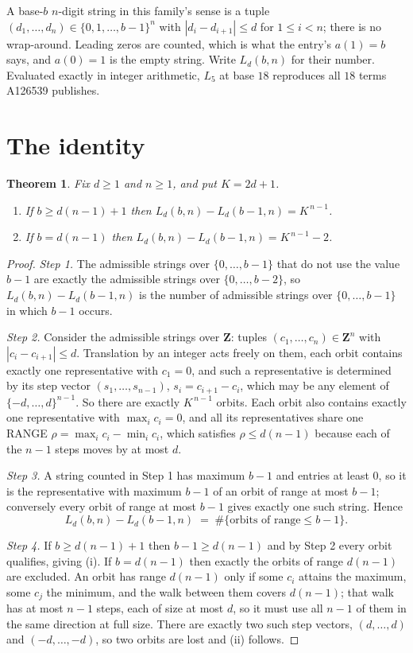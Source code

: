 \documentclass[11pt,a4paper]{article}
\theoremstyle{plain}
\newtheorem{theorem}{Theorem}
\theoremstyle{definition}
\begin{document}
A base-$b$ $n$-digit string in this family's sense is a tuple
$(d_1,\dots,d_n)\in\{0,1,\dots,b-1\}^{n}$ with $|d_i-d_{i+1}|\le d$ for $1\le i<n$; there
is no wrap-around. Leading zeros are counted, which is what the entry's $a(1)=b$ says, and
$a(0)=1$ is the empty string. Write $L_d(b,n)$ for their number. Evaluated exactly in integer
arithmetic, $L_{5}$ at base $18$ reproduces all $18$ terms A126539 publishes.

\section{The identity}

\begin{theorem}
Fix $d\ge1$ and $n\ge1$, and put $K=2d+1$.
\begin{enumerate}
\item[(i)] If $b\ge d(n-1)+1$ then $L_d(b,n)-L_d(b-1,n)=K^{\,n-1}$.
\item[(ii)] If $b=d(n-1)$ then $L_d(b,n)-L_d(b-1,n)=K^{\,n-1}-2$.
\end{enumerate}
\end{theorem}

\begin{proof}
\emph{Step 1.} The admissible strings over $\{0,\dots,b-1\}$ that do not use the value $b-1$
are exactly the admissible strings over $\{0,\dots,b-2\}$, so $L_d(b,n)-L_d(b-1,n)$ is the
number of admissible strings over $\{0,\dots,b-1\}$ in which $b-1$ occurs.

\emph{Step 2.} Consider the admissible strings over $\mathbf{Z}$: tuples
$(c_1,\dots,c_n)\in\mathbf{Z}^{n}$ with $|c_i-c_{i+1}|\le d$. Translation by an integer acts
freely on them, each orbit contains exactly one representative with $c_1=0$, and such a
representative is determined by its step vector $(s_1,\dots,s_{n-1})$, $s_i=c_{i+1}-c_i$,
which may be any element of $\{-d,\dots,d\}^{n-1}$. So there are exactly $K^{\,n-1}$ orbits.
Each orbit also contains exactly one representative with $\max_i c_i=0$, and all its
representatives share one RANGE $\rho=\max_ic_i-\min_ic_i$, which satisfies
$\rho\le d(n-1)$ because each of the $n-1$ steps moves by at most $d$.

\emph{Step 3.} A string counted in Step 1 has maximum $b-1$ and entries at least $0$, so it is
the representative with maximum $b-1$ of an orbit of range at most $b-1$; conversely every orbit
of range at most $b-1$ gives exactly one such string. Hence
\[
L_d(b,n)-L_d(b-1,n)\;=\;\#\{\text{orbits of range}\le b-1\} .
\]

\emph{Step 4.} If $b\ge d(n-1)+1$ then $b-1\ge d(n-1)$ and by Step 2 every orbit qualifies,
giving (i). If $b=d(n-1)$ then exactly the orbits of range $d(n-1)$ are excluded. An orbit has
range $d(n-1)$ only if some $c_i$ attains the maximum, some $c_j$ the minimum, and the walk
between them covers $d(n-1)$; that walk has at most $n-1$ steps, each of size at most $d$, so it
must use all $n-1$ of them in the same direction at full size. There are exactly two such step
vectors, $(d,\dots,d)$ and $(-d,\dots,-d)$, so two orbits are lost and (ii) follows.
\end{proof}
\end{document}
